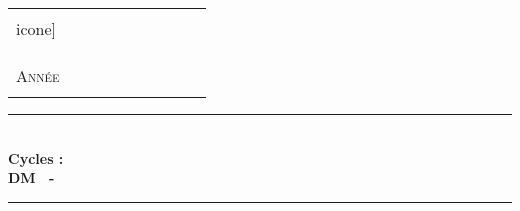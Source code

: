 %
%



   \begin{center} %

	\begin{center}
		\begin{tabular}{p{0.3\linewidth}p{0.6\linewidth}}
			\begin{minipage}{\linewidth}
				\begin{center}
					\texttt{[image: \\icone]}\\[0.5cm]
				\end{center}
			\end{minipage}
			&
			\begin{minipage}{\linewidth}
				\textsc{\Large \etablissement}\\[0.3cm]
				\textsc{\large \discipline}\\[0.3cm]
					\textsc{\large \classe}\\[0.3cm]
					\textsc{\large Année \annee}\\
			\end{minipage}
			\end{tabular}
	\end{center}


	
	\vspace{0.3cm}

    
    \rule{\linewidth}{0.5mm}\\[0.4cm]

    {\textbf{Cycles : }\textsc{\cycle}}\\[0.4cm]

    { \huge \bfseries DM \numerotd\ - \titre}\\[0.4cm]

    \rule{\linewidth}{0.5mm}\\[1cm]


  \end{center}	%